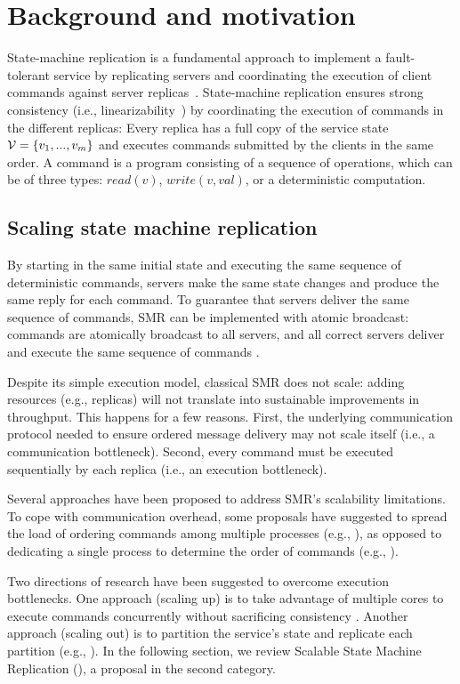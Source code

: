 \section{Background and motivation}
\label{sec:background}

State-machine replication is a fundamental approach to implement a fault-tolerant service by replicating servers and coordinating the execution of client commands against server replicas~\cite{Lam78,Sch90}. 
State-machine replication ensures strong consistency (i.e., linearizability~\cite{Attiya04}) by coordinating the execution of commands in the different replicas: Every replica has a full copy of the service state $\mathcal{V} = \{v_1, ..., v_m\}$ and executes commands submitted by the clients in the same order. A command is a program consisting of a sequence of operations, which can be of three types: $read(v)$, $write(v, val)$, or a deterministic computation.

\subsection{Scaling state machine replication}
By starting in the same initial state and executing the same sequence of deterministic commands, servers make the same state changes and produce the same reply for each command. To guarantee that servers deliver the same sequence of commands, SMR can be implemented with atomic broadcast: commands are atomically broadcast to all servers, and all correct servers deliver and execute the same sequence of commands \cite{BJ87b,DSU04}.

Despite its simple execution model, classical SMR does not scale: adding resources (e.g., replicas) will not translate into sustainable improvements in throughput. This happens for a few reasons. First, the underlying communication protocol needed to ensure ordered message delivery may not scale itself (i.e., a communication bottleneck). Second, every command must be executed sequentially by each replica (i.e., an execution bottleneck).

Several approaches have been proposed to address SMR's scalability limitations. To cope with communication overhead, some proposals have suggested to spread the load of ordering commands among multiple processes (e.g., \cite{Moraru:2013gw,Mencius,Marandi:2012hb}), as opposed to dedicating a single process to determine the order of commands (e.g., \cite{CT96,Lamport:1998ea}).

Two directions of research have been suggested to overcome execution bottlenecks. One approach (scaling up) is to take advantage of multiple cores to execute commands concurrently without sacrificing consistency \cite{Kapritsos:2012um,Marandi:2014bj,Kotla:2004ep,Guo:2014jp}. Another approach (scaling out) is to partition the service's state and replicate each partition (e.g., \cite{Glendenning:2011kj,Marandi:2011dj}). In the following section, we review Scalable State Machine Replication (\ssmr), a proposal in the second category.

